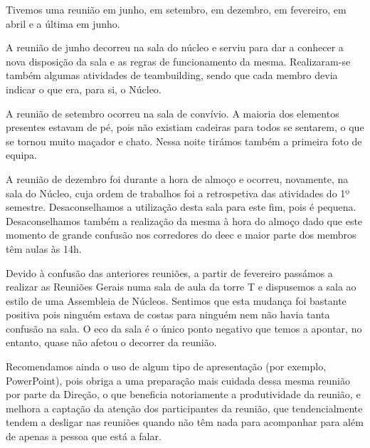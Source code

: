 Tivemos uma reunião em junho, em setembro, em dezembro, em fevereiro, em abril e a última em junho.

A reunião de junho decorreu na sala do núcleo e serviu para dar a conhecer a nova disposição da sala e as regras de funcionamento da mesma. Realizaram-se também algumas atividades de teambuilding, sendo que cada membro devia indicar o que era, para si, o Núcleo.

A reunião de setembro ocorreu na sala de convívio. A maioria dos elementos presentes estavam de pé, pois não existiam cadeiras para todos se sentarem, o que se tornou muito maçador e chato. Nessa noite tirámos também a primeira foto de equipa.

A reunião de dezembro foi durante a hora de almoço e ocorreu, novamente, na sala do Núcleo, cuja ordem de trabalhos foi a retrospetiva das atividades do 1º semestre. Desaconselhamos a utilização desta sala para este fim, pois é pequena. Desaconselhamos também a realização da mesma à hora do almoço dado que este momento de grande confusão nos corredores do \acrshort{deec} e maior parte dos membros têm aulas às 14h.

Devido à confusão das anteriores reuniões, a partir de fevereiro passámos a realizar as Reuniões Gerais numa sala de aula da torre T e dispusemos a sala ao estilo de uma Assembleia de Núcleos. Sentimos que esta mudança foi bastante positiva pois ninguém estava de costas para ninguém nem não havia tanta confusão na sala. O eco da sala é o único ponto negativo que temos a apontar, no entanto, quase não afetou o decorrer da reunião.

Recomendamos ainda o uso de algum tipo de apresentação (por exemplo, PowerPoint), pois obriga a uma preparação mais cuidada dessa mesma reunião por parte da Direção, o que beneficia notoriamente a produtividade da reunião, e melhora a captação da atenção dos participantes da reunião, que tendencialmente tendem a desligar nas reuniões quando não têm nada para acompanhar para além de apenas a pessoa que está a falar.